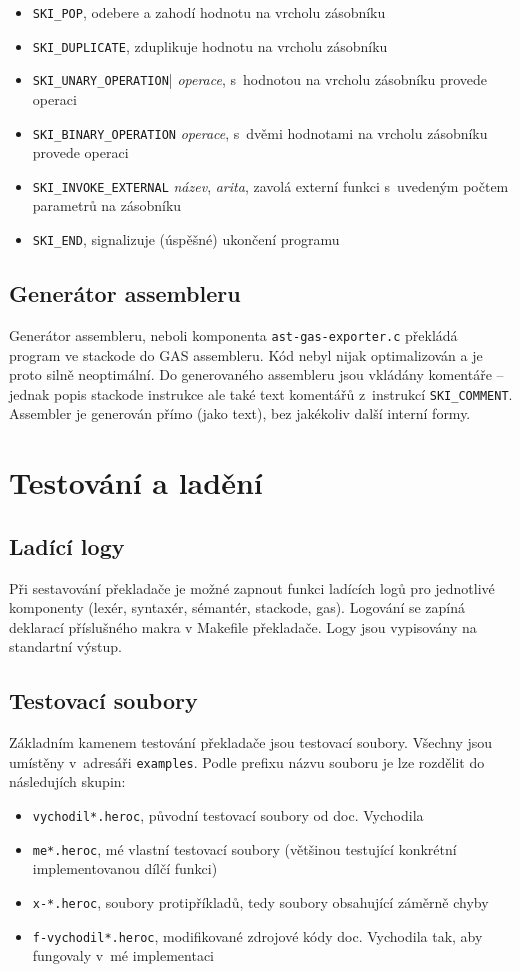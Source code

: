 \documentclass[a4paper,10pt]{article}
\begin{document}
\begin{itemize}
	\item \verb|SKI_POP|, odebere a zahodí hodnotu na vrcholu zásobníku 
	\item \verb|SKI_DUPLICATE|, zduplikuje hodnotu na vrcholu zásobníku 

	\item \verb|SKI_UNARY_OPERATION|| \textit{operace}, s~hodnotou na vrcholu zásobníku provede operaci
	\item \verb|SKI_BINARY_OPERATION| \textit{operace}, s~dvěmi hodnotami na vrcholu zásobníku provede operaci

	\item \verb|SKI_INVOKE_EXTERNAL| \textit{název}, \textit{arita}, zavolá externí funkci s~uvedeným počtem parametrů na zásobníku
	\item \verb|SKI_END|, signalizuje (úspěšné) ukončení programu
\end{itemize}

\subsection{Generátor assembleru}
Generátor assembleru, neboli komponenta \verb|ast-gas-exporter.c| překládá program ve stackode do GAS assembleru. Kód nebyl nijak optimalizován a je proto silně neoptimální. Do generovaného assembleru jsou vkládány komentáře -- jednak popis stackode instrukce ale také text komentářů z~instrukcí \verb|SKI_COMMENT|. Assembler je generován přímo (jako text), bez jakékoliv další interní formy. 

\section{Testování a ladění}

\subsection{Ladící logy}
Při sestavování překladače je možné zapnout funkci ladících logů pro jednotlivé komponenty (lexér, syntaxér, sémantér, stackode, gas). Logování se zapíná deklarací příslušného makra v Makefile překladače. Logy jsou vypisovány na standartní výstup.

\subsection{Testovací  soubory}
Základním kamenem testování překladače jsou testovací soubory. Všechny jsou umístěny v~adresáři \verb|examples|. Podle prefixu názvu souboru je lze rozdělit do následujích skupin:
\begin{itemize}
 \item \verb|vychodil*.heroc|, původní testovací soubory od doc. Vychodila
 \item \verb|me*.heroc|, mé vlastní testovací soubory (většinou testující konkrétní implementovanou dílčí funkci)
 \item \verb|x-*.heroc|, soubory protipříkladů, tedy soubory obsahující záměrně chyby
 \item \verb|f-vychodil*.heroc|, modifikované zdrojové kódy doc. Vychodila tak, aby fungovaly v~mé implementaci
\end{itemize}
\end{document}
